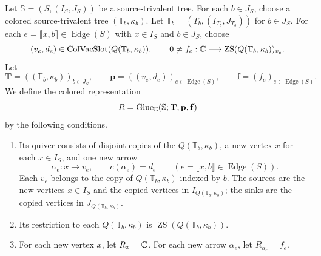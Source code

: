 \begin{definition}\label{def:attachments}
Let $\mathbb S=(S,(I_S,J_S))$ be a source-trivalent tree.
For each $b\in J_S$, choose a colored source-trivalent tree $(\mathbb T_b,\kappa_b)$.
Let $\mathbb T_b=(T_b,(I_{T_b},J_{T_b}))$ for $b\in J_S$.
For each $e=\llbracket x,b\rrbracket\in\operatorname{Edge}(S)$ with
$x\in I_{S}$ and $b\in J_{S}$, choose
\[
 (v_e,d_e)\in\operatorname{ColVacSlot}(Q(\mathbb T_b,\kappa_b)),\qquad
 0\ne f_e:\mathbb C\longrightarrow\operatorname{ZS}(Q(\mathbb T_b,\kappa_b))_{v_e}.
\]
Let
\[
 \mathbf T=((\mathbb T_b,\kappa_b))_{b\in J_{S}},\qquad
 \mathbf p=((v_e,d_e))_{e\in\operatorname{Edge}(S)},\qquad
 \mathbf f=(f_e)_{e\in\operatorname{Edge}(S)}.
\]
We define the colored representation
\[
 R=\operatorname{Glue}_{\mathbb C}(\mathbb S;\mathbf T,\mathbf p,\mathbf f)
\]
by the following conditions.
\begin{enumerate}[font=\itshape]
\item Its quiver consists of disjoint copies of the $Q(\mathbb T_b,\kappa_b)$, a new vertex
$x$ for each $x\in I_{S}$, and one new arrow
\[
 \alpha_e:x\longrightarrow v_e,\qquad c(\alpha_e)=d_e
 \qquad(e=\llbracket x,b\rrbracket\in\operatorname{Edge}(S)).
\]
Each $v_e$ belongs to the copy of $Q(\mathbb T_b,\kappa_b)$ indexed by $b$.
The sources are the new vertices $x\in I_S$ and the copied vertices in $I_{Q(\mathbb T_b,\kappa_b)}$; the sinks are the copied vertices in $J_{Q(\mathbb T_b,\kappa_b)}$.
\item Its restriction to each $Q(\mathbb T_b,\kappa_b)$ is $\operatorname{ZS}(Q(\mathbb T_b,\kappa_b))$.
\item For each new vertex $x$, let $R_x=\mathbb C$.
For each new arrow $\alpha_e$, let $R_{\alpha_e}=f_e$.
\end{enumerate}
\end{definition}
